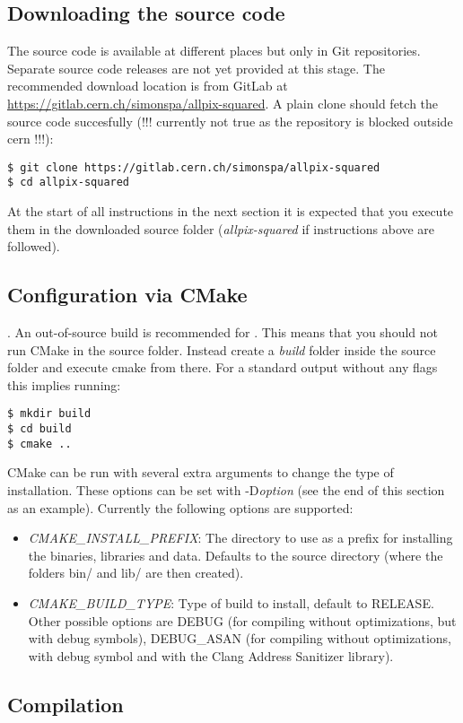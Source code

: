 \subsection{Downloading the source code}
The source code is available at different places but only in Git repositories. Separate source code releases are not yet provided at this stage. The recommended download location is from GitLab at \url{https://gitlab.cern.ch/simonspa/allpix-squared}. A plain clone should fetch the source code succesfully (!!! currently not true as the repository is blocked outside cern !!!):

\begin{verbatim}
$ git clone https://gitlab.cern.ch/simonspa/allpix-squared
$ cd allpix-squared
\end{verbatim}

At the start of all instructions in the next section it is expected that you execute them in the downloaded source folder (\textit{allpix-squared} if instructions above are followed).

\subsection{Configuration via CMake}
\label{sec:cmake_config}.
An out-of-source build is recommended for \apsq. This means that you should not run CMake in the source folder. Instead create a \textit{build} folder inside the source folder and execute cmake from there. For a standard output without any flags this implies running:

\begin{verbatim}
$ mkdir build
$ cd build
$ cmake ..
\end{verbatim}

CMake can be run with several extra arguments to change the type of installation. These options can be set with -D\textit{option} (see the end of this section as an example). Currently the following options are supported:
\begin{itemize}
\item \textit{CMAKE_INSTALL_PREFIX}: The directory to use as a prefix for installing the binaries, libraries and data. Defaults to the source directory (where the folders bin/ and lib/ are then created). 
\item \textit{CMAKE_BUILD_TYPE}: Type of build to install, default to RELEASE. Other possible options are DEBUG (for compiling without optimizations, but with debug symbols), DEBUG_ASAN (for compiling without optimizations, with debug symbol and with the Clang Address Sanitizer library). 
\end{itemize}

\subsection{Compilation}
